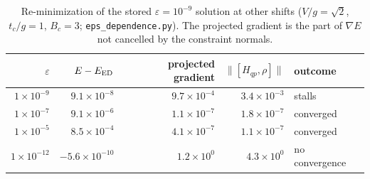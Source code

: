 \begin{table}[h]
\centering\small
\begin{tabular}{r r r r l}
\toprule
$\varepsilon$ & $E-E_{\rm ED}$ & projected gradient & $\|[H_{qp},\rho]\|$ & outcome\\
\midrule
$1\times10^{-9}$ & $9.1\times10^{-8}$ & $9.7\times10^{-4}$ & $3.4\times10^{-3}$ & stalls\\
$1\times10^{-7}$ & $9.1\times10^{-6}$ & $1.1\times10^{-7}$ & $1.8\times10^{-7}$ & converged\\
$1\times10^{-5}$ & $8.5\times10^{-4}$ & $4.1\times10^{-7}$ & $1.1\times10^{-7}$ & converged\\
$1\times10^{-12}$ & $-5.6\times10^{-10}$ & $1.2\times10^{0}$ & $4.3\times10^{0}$ & no convergence\\
\bottomrule
\end{tabular}
\caption{Re-minimization of the stored $\varepsilon=10^{-9}$ solution at other shifts ($V/g=\sqrt2$, $t_c/g=1$, $B_c=3$; \texttt{eps\_dependence.py}). The projected gradient is the part of $\nabla E$ not cancelled by the constraint normals.}
\label{tab:eps}
\end{table}
